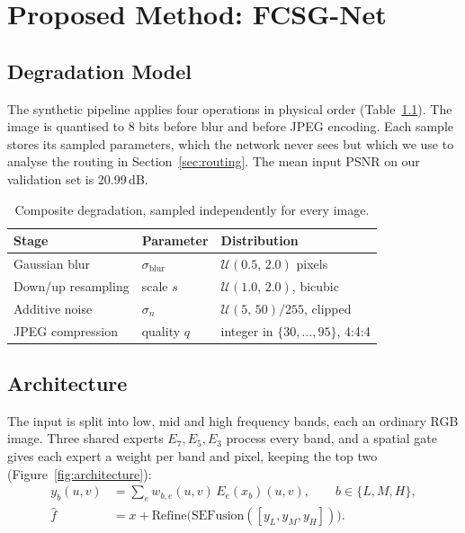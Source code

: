 \documentclass[12pt,a4paper,oneside]{NITR}
\newcommand{\fcsg}{FCSG-Net}
\newcommand{\dB}{\,dB}
\begin{document}

\chapter{Proposed Method: \fcsg}\label{ch:method}

\section{Degradation Model}\label{sec:degradation}

The synthetic pipeline applies four operations in physical order
(Table~\ref{tab:degradation}). The image is quantised to 8 bits before blur
and before JPEG encoding. Each sample stores its sampled parameters, which the
network never sees but which we use to analyse the routing in
Section~\ref{sec:routing}. The mean input PSNR on our validation set is
20.99\dB{}.

\begin{table}[htbp]
	\centering
	\caption{Composite degradation, sampled independently for every image.}
	\label{tab:degradation}
	\small
	\begin{tabular}{@{}lll@{}}
		\toprule
		Stage & Parameter & Distribution \\
		\midrule
		Gaussian blur        & $\sigma_\text{blur}$ & $\mathcal{U}(0.5,\, 2.0)$ pixels \\
		Down/up resampling   & scale $s$            & $\mathcal{U}(1.0,\, 2.0)$, bicubic \\
		Additive noise       & $\sigma_n$           & $\mathcal{U}(5,\, 50)/255$, clipped \\
		JPEG compression     & quality $q$          & integer in $\{30,\dots,95\}$, 4:4:4 \\
		\bottomrule
	\end{tabular}
\end{table}

\section{Architecture}\label{sec:arch}

The input is split into low, mid and high frequency bands, each an ordinary
RGB image. Three shared experts $E_7,E_5,E_3$ process every band, and a
spatial gate gives each expert a weight per band and pixel, keeping the top
two (Figure~\ref{fig:architecture}):
\begin{align}
	y_b(u,v) &= \textstyle\sum_{e} w_{b,e}(u,v)\, E_e(x_b)(u,v), \qquad b\in\{L,M,H\},\label{eq:mix}\\
	\hat f &= x + \mathrm{Refine}\big(\mathrm{SEFusion}([y_L,y_M,y_H])\big).\label{eq:out}
\end{align}
\end{document}
